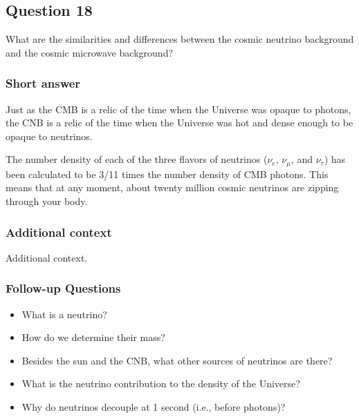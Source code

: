 \documentclass[a4paper,11pt]{article}
\begin{document}
%
%

\newpage
\subsection{Question 18}

What are the similarities and differences between the cosmic neutrino background and the cosmic microwave background?

\subsubsection{Short answer}

Just as the CMB is a relic of the time when the Universe was opaque to photons, the CNB is a relic of the time when the Universe was hot and dense enough to be opaque to neutrinos.

{\noindent}The number density of each of the three flavors of neutrinos ($\nu_e$, $\nu_\mu$, and $\nu_\tau$) has been calculated to be 3/11 times the number density of CMB photons. This means that at any moment, about twenty million cosmic neutrinos are zipping through your body.

\subsubsection{Additional context}

Additional context.

\subsubsection{Follow-up Questions}

\begin{itemize}
    \item What is a neutrino?
    \item How do we determine their mass?
    \item Besides the sun and the CNB, what other sources of neutrinos are there?
    \item What is the neutrino contribution to the density of the Universe?
    \item Why do neutrinos decouple at 1 second (i.e., before photons)?
\end{itemize}


%
%
\end{document}
